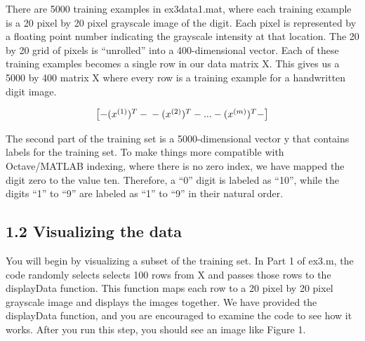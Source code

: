 \documentclass[
]{book}
\begin{document}
There are 5000 training examples in ex3data1.mat, where each training example is a 20 pixel by 20 pixel grayscale image of the digit. Each pixel is represented by a floating point number indicating the grayscale intensity at that location. The 20 by 20 grid of pixels is ``unrolled'' into a 400-dimensional vector. Each of these training examples becomes a single row in our data matrix X. This gives us a 5000 by 400 matrix X where every row is a training example for a handwritten digit image.

\begin{align} \begin{bmatrix} - (x^{(1)})^{T} - \newline - (x^{(2)})^{T} -  \newline . \newline . \newline . \newline - (x^{(m)})^{T} -  \end{bmatrix} \end{align}

The second part of the training set is a 5000-dimensional vector y that contains labels for the training set. To make things more compatible with Octave/MATLAB indexing, where there is no zero index, we have mapped the digit zero to the value ten. Therefore, a ``0'' digit is labeled as ``10'', while the digits ``1'' to ``9'' are labeled as ``1'' to ``9'' in their natural order.

\hypertarget{visualizing-the-data}{%
\subsection{1.2 Visualizing the data}\label{visualizing-the-data}}

You will begin by visualizing a subset of the training set. In Part 1 of ex3.m, the code randomly selects selects 100 rows from X and passes those rows to the displayData function. This function maps each row to a 20 pixel by 20 pixel grayscale image and displays the images together. We have provided the displayData function, and you are encouraged to examine the code to see how it works. After you run this step, you should see an image like Figure 1.
\end{document}
